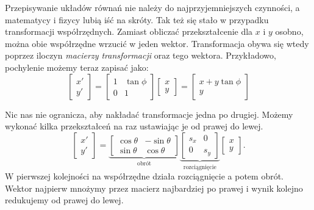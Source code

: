 \documentclass[10pt,twocolumn,fleqn,polish]{article}
\begin{document}
Przepisywanie układów równań nie należy do najprzyjemniejszych czynności, a
matematycy i fizycy lubią iść na skróty. Tak też się stało w przypadku transformacji
współrzędnych. Zamiast obliczać przekształcenie dla $x$ i $y$ osobno, można obie
współrzędne wrzucić w jeden wektor. Transformacja obywa się wtedy poprzez
iloczyn \textit{macierzy transformacji} oraz tego wektora.
Przykładowo, pochylenie możemy teraz zapisać jako:
\[
  \begin{bmatrix}x' \\ y'\end{bmatrix} =
  \begin{bmatrix}1 & \tan\phi \\ 0 & 1\end{bmatrix}
  \begin{bmatrix}x \\ y\end{bmatrix} =
  \begin{bmatrix}x + y\tan\phi \\ y\end{bmatrix}
\]

Nic nas nie ogranicza, aby nakładać transformacje jedna po drugiej. Możemy
wykonać kilka przekształceń na raz ustawiając je od prawej do lewej.
\[
  \begin{bmatrix}
    x' \\ y'
  \end{bmatrix} =
  \underbrace{
    \begin{bmatrix}
      \cos \theta & -\sin \theta \\
      \sin \theta & \cos \theta
    \end{bmatrix}
  }_\text{obrót}
  \underbrace{
    \begin{bmatrix}
      s_x & 0   \\
      0   & s_y
    \end{bmatrix}
  }_\text{rozciągnięcie}
  \begin{bmatrix}
    x \\ y
  \end{bmatrix}.
\]
W pierwszej kolejności na współrzędne działa rozciągnięcie a potem obrót.
Wektor najpierw mnożymy przez macierz najbardziej po prawej i wynik kolejno
redukujemy od prawej do lewej.
\end{document}
